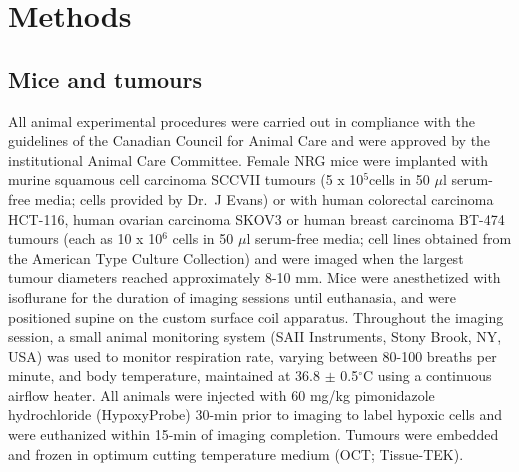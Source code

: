 \section{Methods}
\subsection{Mice and tumours}

All animal experimental procedures were carried out in compliance with the guidelines of the Canadian Council for Animal Care and were approved by the institutional Animal Care Committee. 
Female NRG mice were implanted with murine squamous cell carcinoma SCCVII tumours (5 x 10$^5 $cells in 50 $\mu$l serum-free media; cells provided by Dr.\ J Evans) or with human colorectal carcinoma HCT-116, human ovarian carcinoma SKOV3 or human breast carcinoma BT-474 tumours (each as 10 x 10$^6$ cells in 50 $\mu$l serum-free media; cell lines obtained from the American Type Culture Collection) and were imaged when the largest tumour diameters reached approximately 8-10 mm.
Mice were anesthetized with isoflurane for the duration of imaging sessions until euthanasia, and were positioned supine on the custom surface coil apparatus.
Throughout the imaging session, a small animal monitoring system (SAII Instruments, Stony Brook, NY, USA) was used to monitor respiration rate, varying between 80-100 breaths per minute, and body temperature, maintained at 36.8 $\pm$ 0.5$^\circ$C using a continuous airflow heater.
All animals were injected with 60 mg/kg pimonidazole hydrochloride (HypoxyProbe) 30-min prior to imaging to label hypoxic cells and were euthanized within 15-min of imaging completion.
Tumours were embedded and frozen in optimum cutting temperature medium (OCT; Tissue-TEK).

